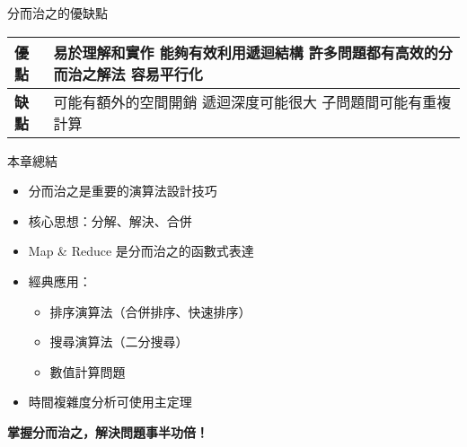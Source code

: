 \documentclass{beamer}
\begin{document}
\begin{frame}{分而治之的優缺點}
\begin{center}
\renewcommand{\arraystretch}{1.4}
\begin{tabular}{|>{\centering\arraybackslash}m{3cm}|>{\raggedright\arraybackslash}m{6.5cm}|}
\hline
\textbf{優點} & 
易於理解和實作 \newline
能夠有效利用遞迴結構 \newline
許多問題都有高效的分而治之解法 \newline
容易平行化 \\
\hline
\textbf{缺點} & 
可能有額外的空間開銷 \newline
遞迴深度可能很大 \newline
子問題間可能有重複計算 \\
\hline
\end{tabular}
\end{center}
\end{frame}

\begin{frame}{本章總結}
\begin{itemize}
    \item 分而治之是重要的演算法設計技巧
    \item 核心思想：分解、解決、合併
    \item Map \& Reduce 是分而治之的函數式表達
    \item 經典應用：
    \begin{itemize}
        \item 排序演算法（合併排序、快速排序）
        \item 搜尋演算法（二分搜尋）
        \item 數值計算問題
    \end{itemize}
    \item 時間複雜度分析可使用主定理
\end{itemize}

\vspace{1em}
\begin{center}
    \textbf{掌握分而治之，解決問題事半功倍！}
\end{center}
\end{frame}
\end{document}
